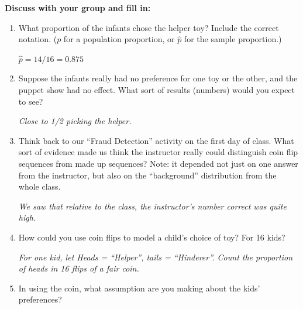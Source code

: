 {\bf Discuss with your group and fill in:	}\vspace{-.3cm}
\begin{enumerate}
  \item  What proportion of the infants chose the helper toy? Include
    the correct notation. ($p$ for a population proportion, or
    $\widehat{p}$ for the sample proportion.)
\begin{students}
     \vspace{1cm}
\end{students}

\begin{key}
     {\it  $\widehat{p} = 14/16 = 0.875$ }
\end{key}
\item  
     Suppose the infants really had no preference for one toy or the other,
     and the puppet show had no effect.  What sort of results
     (numbers) would     you expect to see?
\begin{students}
       \vspace{1cm}
\end{students}

\begin{key}
       {\it  Close to 1/2 picking the helper.}
\end{key}

   \item Think back to our ``Fraud Detection'' activity on the first day of
     class.  What sort of evidence made us think the instructor really
     could distinguish coin flip sequences from made up sequences?  Note:
     it depended not just on one answer from the instructor, but also
     on the ``background'' distribution from the whole class.
\begin{students}
  \vspace{2cm}
\end{students}

\begin{key}
       {\it   We saw that relative to the class, the instructor's number
         correct was quite high.}
\end{key}
 
   \item How could you use coin flips to model a child's choice of
     toy? For 16 kids?
\begin{students}
  \vspace{2cm}
\end{students}

\begin{key}
       {\it  For one kid, let Heads = ``Helper'', tails =
         ``Hinderer''.  Count the proportion of heads in 16 flips of a
         fair coin.} 
\end{key}
   \item In using the coin, what assumption are you making about the
     kids' preferences? 
\begin{students}
  \vspace*{2cm}
\end{students}


\end{enumerate}

